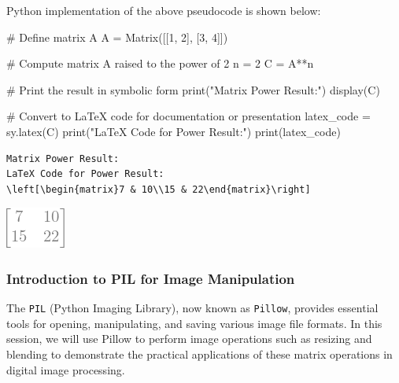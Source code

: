 \documentclass[
  letterpaper,
  DIV=11,
  numbers=noendperiod]{scrreprt}
\newenvironment{Shaded}{\begin{snugshade}}{\end{snugshade}}
\newcommand{\BuiltInTok}[1]{\textcolor[rgb]{0.00,0.23,0.31}{#1}}
\newcommand{\CommentTok}[1]{\textcolor[rgb]{0.37,0.37,0.37}{#1}}
\newcommand{\DecValTok}[1]{\textcolor[rgb]{0.68,0.00,0.00}{#1}}
\newcommand{\NormalTok}[1]{\textcolor[rgb]{0.00,0.23,0.31}{#1}}
\newcommand{\OperatorTok}[1]{\textcolor[rgb]{0.37,0.37,0.37}{#1}}
\newcommand{\StringTok}[1]{\textcolor[rgb]{0.13,0.47,0.30}{#1}}
\theoremstyle{plain}
\theoremstyle{definition}
\theoremstyle{remark}
\begin{document}
Python implementation of the above pseudocode is shown below:

\begin{Shaded}
\begin{Highlighting}[]
\CommentTok{\# Define matrix A}
\NormalTok{A }\OperatorTok{=}\NormalTok{ Matrix([[}\DecValTok{1}\NormalTok{, }\DecValTok{2}\NormalTok{], [}\DecValTok{3}\NormalTok{, }\DecValTok{4}\NormalTok{]])}

\CommentTok{\# Compute matrix A raised to the power of 2}
\NormalTok{n }\OperatorTok{=} \DecValTok{2}
\NormalTok{C }\OperatorTok{=}\NormalTok{ A}\OperatorTok{**}\NormalTok{n}

\CommentTok{\# Print the result in symbolic form}
\BuiltInTok{print}\NormalTok{(}\StringTok{"Matrix Power Result:"}\NormalTok{)}
\NormalTok{display(C)}

\CommentTok{\# Convert to LaTeX code for documentation or presentation}
\NormalTok{latex\_code }\OperatorTok{=}\NormalTok{ sy.latex(C)}
\BuiltInTok{print}\NormalTok{(}\StringTok{"LaTeX Code for Power Result:"}\NormalTok{)}
\BuiltInTok{print}\NormalTok{(latex\_code)}
\end{Highlighting}
\end{Shaded}

\begin{verbatim}
Matrix Power Result:
LaTeX Code for Power Result:
\left[\begin{matrix}7 & 10\\15 & 22\end{matrix}\right]
\end{verbatim}

\includegraphics{module_1_files/figure-pdf/cell-7-output-2.png}

\subsubsection{Introduction to PIL for Image
Manipulation}\label{introduction-to-pil-for-image-manipulation}

The \texttt{PIL} (Python Imaging Library), now known as \texttt{Pillow},
provides essential tools for opening, manipulating, and saving various
image file formats. In this session, we will use Pillow to perform image
operations such as resizing and blending to demonstrate the practical
applications of these matrix operations in digital image processing.
\end{document}
